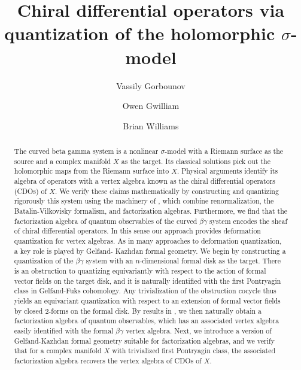 \documentclass[10pt,oneside]{amsart}
\title{Chiral differential operators via\\quantization of the holomorphic $\sigma$-model}
\author{Vassily Gorbounov}
\author{Owen Gwilliam}
\author{Brian Williams}
\begin{document}
\maketitle

\begin{abstract}
The curved beta gamma system is a nonlinear $\sigma$-model with a Riemann surface as the source and a complex manifold $X$ as the target. Its classical solutions pick out the holomorphic maps from the Riemann surface into $X$. Physical arguments identify its algebra of operators with a vertex algebra known as the chiral differential operators (CDOs) of $X$. We verify these claims mathematically by constructing and quantizing rigorously this system using the machinery of \cite{CG1, CG2}, which combine renormalization, the Batalin-Vilkovisky formalism, and factorization algebras. Furthermore, we find that the factorization algebra of quantum observables of the curved $\beta\gamma$ system encodes the sheaf of chiral differential operators. In this sense our approach provides deformation quantization for vertex algebras. As in many approaches to deformation quantization, a key role is played by Gelfand- Kazhdan formal geometry. We begin by constructing a quantization of the $\beta\gamma$ system with an $n$-dimensional formal disk as the target. There is an obstruction to quantizing equivariantly with respect to the action of formal vector fields on the target disk, and it is naturally identified with the first Pontryagin class in Gelfand-Fuks cohomology. Any trivialization of the obstruction cocycle thus yields an equivariant quantization with respect to an extension of formal vector fields by closed $2$-forms on the formal disk. By results in \cite{CG1}, we then naturally obtain a factorization algebra of quantum observables, which has an associated vertex algebra easily identified with the formal $\beta\gamma$ vertex algebra. Next, we introduce a version of Gelfand-Kazhdan formal geometry suitable for factorization algebras, and we verify that for a complex manifold $X$ with trivialized first Pontryagin class, the associated factorization algebra recovers the vertex algebra of CDOs of $X$.
\end{abstract}
\end{document}
